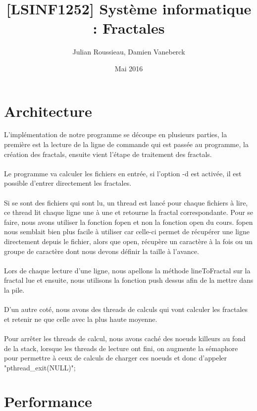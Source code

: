 \documentclass[11pt]{article}
\title{[LSINF1252] Système informatique : Fractales}
\author{Julian Roussieau, Damien Vaneberck }
\date{Mai 2016}
\begin{document}
\maketitle

\section{Architecture}

L'implémentation de notre programme se découpe en plusieurs parties, la première est la lecture de la ligne de commande qui est passée au programme, la création des fractals, ensuite vient l'étape de traitement des fractals.
\\
\\
Le programme va calculer les fichiers en entrée, si l'option -d est activée, il est possible d'entrer directement les fractales.
\\
\\
Si se sont des fichiers qui sont lu, un thread est lancé pour chaque fichiers à lire, ce thread lit chaque ligne une à une et retourne la fractal correspondante. Pour se faire, nous avons utiliser la fonction fopen et non la fonction open du cours. fopen nous semblait bien plus facile à utiliser car celle-ci permet de récupérer une ligne directement depuis le fichier, alors que open, récupère un caractère à la fois ou un groupe de caractère dont nous devons définir la taille à l'avance.
\\
\\
Lors de chaque lecture d'une ligne, nous apellons la méthode lineToFractal sur la fractal lue et ensuite, nous utilisons la fonction push dessus afin de la mettre dans la pile.
\\
\\
D'un autre coté, nous avons des threads de calculs qui vont calculer les fractales et retenir ne que celle avec la plus haute moyenne. 
\\
\\
Pour arrêter les threads de calcul, nous avons caché des noeuds killeurs au fond de la stack, lorsque les threads de lecture ont fini, on augmente la sémaphore pour permettre à ceux de calculs de charger ces noeuds et donc d'appeler "pthread\_exit(NULL)";





\section{Performance}
\end{document}
